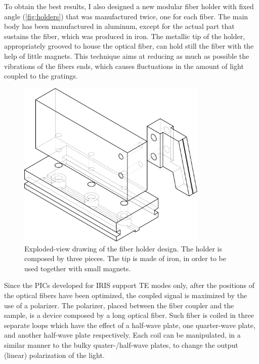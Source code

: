 To obtain the best results, I also designed a new modular fiber holder with fixed angle (\autoref{fig:holders}) that was manufactured twice, one for each fiber. %
The main body has been manufactured in aluminum, except for the actual part that sustains the fiber, which was produced in iron.
The metallic tip of the holder, appropriately grooved to house the optical fiber, can hold still the fiber with the help of little magnets.
This technique aims at reducing as much as possible the vibrations of the fibers ends, which causes fluctuations in the amount of light coupled to the gratings.

\begin{figure}[htbp]
	\centering
	\includegraphics[height=8cm]{figures/supporto_completo.pdf}
	\caption{Exploded-view drawing of the fiber holder design.
	The holder is composed by three pieces.
	The tip is made of iron, in order to be used together with small magnets.}
	\label{fig:holders}
\end{figure}

Since the \acp{PIC} developed for IRIS support \acs{TE} modes only, after the positions of the optical fibers have been optimized, the coupled signal is maximized by the use of a polarizer.
The polarizer, placed between the fiber coupler and the sample, is a device composed by a long optical fiber.
Such fiber is coiled in three separate loops which have the effect of a half-wave plate, one quarter-wave plate, and another half-wave plate respectively.
Each coil can be manipulated, in a similar manner to the bulky quater-/half-wave plates, to change the output (linear) polarization of the light.

